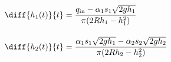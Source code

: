 \begin{subequations}
  \begin{align}
    \diff{h_1(t)}{t} & =
    \frac{
      q_{\mathrm{in}} - \alpha_1 s_1 \sqrt{2gh_1}
    }{
      \pi (2 R h_1 - h_1^2)
    }
    \label{eq:tank_system_a} \\[10pt]
    \diff{h_2(t)}{t} & =
    \frac{
      \alpha_1 s_1 \sqrt{2gh_1} - \alpha_2 s_2 \sqrt{2gh_2}
    }{
      \pi (2 R h_2 - h_2^2)
    }
    \label{eq:tank_system_b}
  \end{align}
\end{subequations}
